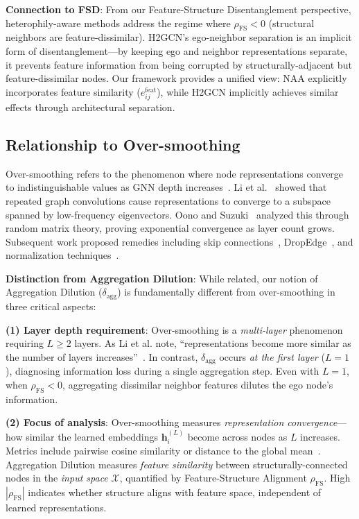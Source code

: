 \textbf{Connection to FSD}: From our Feature-Structure Disentanglement perspective, heterophily-aware methods address the regime where $\rho_{\text{FS}} < 0$ (structural neighbors are feature-dissimilar). H2GCN's ego-neighbor separation is an implicit form of disentanglement---by keeping ego and neighbor representations separate, it prevents feature information from being corrupted by structurally-adjacent but feature-dissimilar nodes. Our framework provides a unified view: NAA explicitly incorporates feature similarity ($e_{ij}^{\text{feat}}$), while H2GCN implicitly achieves similar effects through architectural separation.

\subsection{Relationship to Over-smoothing}

Over-smoothing refers to the phenomenon where node representations converge to indistinguishable values as GNN depth increases~\cite{li2018deeper,oono2020graph}. Li et al.~\cite{li2018deeper} showed that repeated graph convolutions cause representations to converge to a subspace spanned by low-frequency eigenvectors. Oono and Suzuki~\cite{oono2020graph} analyzed this through random matrix theory, proving exponential convergence as layer count grows. Subsequent work proposed remedies including skip connections~\cite{li2019deepgcns}, DropEdge~\cite{rong2020dropedge}, and normalization techniques~\cite{zhao2020pairnorm}.

\textbf{Distinction from Aggregation Dilution}: While related, our notion of Aggregation Dilution ($\delta_{\text{agg}}$) is fundamentally different from over-smoothing in three critical aspects:

\textbf{(1) Layer depth requirement}: Over-smoothing is a \textit{multi-layer} phenomenon requiring $L \geq 2$ layers. As Li et al. note, ``representations become more similar as the number of layers increases''~\cite{li2018deeper}. In contrast, $\delta_{\text{agg}}$ occurs \textit{at the first layer} ($L=1$), diagnosing information loss during a single aggregation step. Even with $L=1$, when $\rho_{\text{FS}} < 0$, aggregating dissimilar neighbor features dilutes the ego node's information.

\textbf{(2) Focus of analysis}: Over-smoothing measures \textit{representation convergence}---how similar the learned embeddings $\mathbf{h}_i^{(L)}$ become across nodes as $L$ increases. Metrics include pairwise cosine similarity or distance to the global mean~\cite{chen2020measuring}. Aggregation Dilution measures \textit{feature similarity} between structurally-connected nodes in the \textit{input space} $\mathcal{X}$, quantified by Feature-Structure Alignment $\rho_{\text{FS}}$. High $|\rho_{\text{FS}}|$ indicates whether structure aligns with feature space, independent of learned representations.

